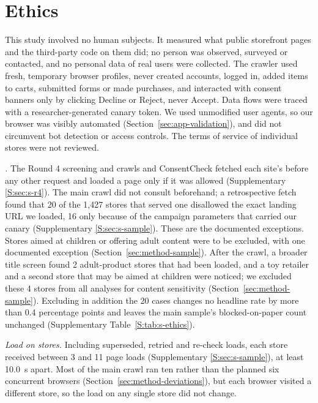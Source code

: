 \section{Ethics}\label{sec:ethics}

This study involved no human subjects. It measured what public storefront pages and the third-party code on them did; no person was observed, surveyed or contacted, and no personal data of real users were collected. The crawler used fresh, temporary browser profiles, never created accounts, logged in, added items to carts, submitted forms or made purchases, and interacted with consent banners only by clicking Decline or Reject, never Accept. Data flows were traced with a researcher-generated canary token. We used unmodified user agents, so our browser was visibly automated (Section~\ref{sec:app-validation}), and did not circumvent bot detection or access controls. The terms of service of individual stores were not reviewed.

\emph{.} The Round 4 screening and crawls and ConsentCheck fetched each site's  before any other request and loaded a page only if it was allowed (Supplementary \ref*{S:sec:s-r4}). The main crawl did not consult  beforehand; a retrospective fetch found that 20 of the 1,427 stores that served one disallowed the exact landing URL we loaded, 16 only because of the campaign parameters that carried our canary (Supplementary \ref*{S:sec:s-sample}). These are the documented exceptions. Stores aimed at children or offering adult content were to be excluded, with one documented exception (Section~\ref{sec:method-sample}). After the crawl, a broader title screen found 2 adult-product stores that had been loaded, and a toy retailer and a second store that may be aimed at children were noticed; we excluded these 4 stores from all analyses for content sensitivity (Section~\ref{sec:method-sample}). Excluding in addition the 20  cases changes no headline rate by more than 0.4 percentage points and leaves the main sample's blocked-on-paper count unchanged (Supplementary Table~\ref*{S:tab:s-ethics}).

\emph{Load on stores.} Including superseded, retried and re-check loads, each store received between 3 and 11 page loads (Supplementary \ref*{S:sec:s-sample}), at least 10.0~s apart. Most of the main crawl ran ten rather than the planned six concurrent browsers (Section~\ref{sec:method-deviations}), but each browser visited a different store, so the load on any single store did not change.

